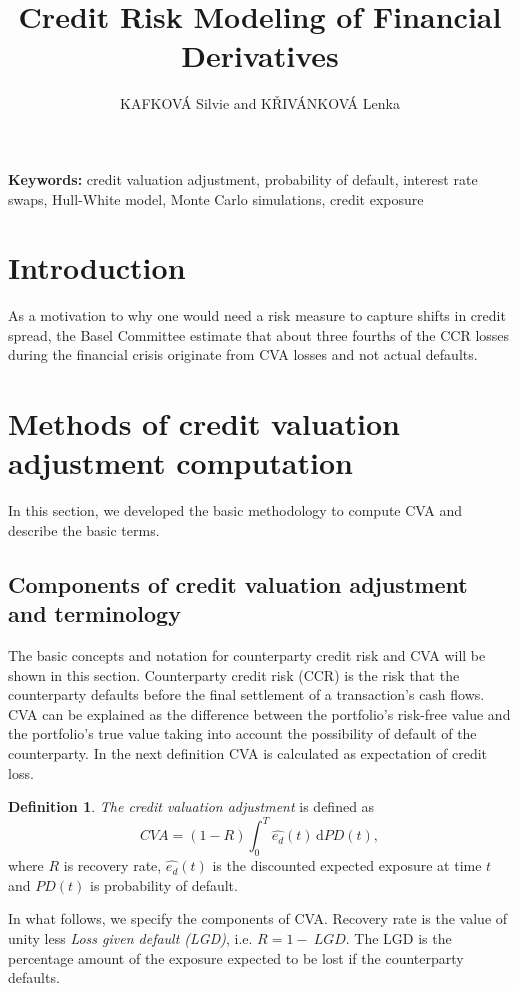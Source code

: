\documentclass{amsart}
\theoremstyle{definition}\newtheorem{definition}[theorem]{Definition}
\theoremstyle{remark}\newtheorem{remark}[theorem]{Remark}
\newcommand{\dif}{\,\mathrm{d}}
\begin{document}
\title{Credit Risk Modeling of Financial Derivatives}
\author{KAFKOVÁ Silvie and KŘIVÁNKOVÁ Lenka}

\begin{abstract}
\end{abstract}
\maketitle

\noindent\textbf{Keywords:} credit valuation adjustment, probability of default, interest rate swaps, Hull-White model, Monte Carlo simulations, credit exposure

\bigskip

\section{Introduction}
As a motivation to why one would need a risk measure to capture shifts in credit spread, the Basel Committee estimate that about three fourths of the CCR losses during the financial crisis originate from CVA losses and not actual defaults.

\section{Methods of credit valuation adjustment computation}
In this section, we developed the basic methodology to compute CVA and describe the basic terms.

\subsection{Components of credit valuation adjustment and terminology}
The basic concepts and notation for counterparty credit risk and CVA will be shown in this section.
Counterparty credit risk (CCR) is the risk that the counterparty defaults before the final settlement of a transaction's cash flows.
CVA can be explained as the difference between the portfolio’s risk-free value and the portfolio’s true value taking into account the possibility of default of the counterparty.
In the next definition CVA is calculated as expectation of credit loss.
\begin{definition}
 \textit{The credit valuation adjustment} is defined as
 \begin{equation}
 CVA=(1-R)\int_{0}^T \hat{e_d}(t)\dif PD(t),
 \label{CVA}
\end{equation}
  where $R$ is recovery rate, $\hat{e_d}(t)$ is the discounted expected exposure at time $t$ and $PD(t)$ is probability of default.
\end{definition}
In what follows, we specify the components of CVA. 
Recovery rate is the value of unity less \textit{Loss given default (LGD)}, i.e. $R=1-~LGD$.
The LGD is the percentage amount of the exposure expected to be lost if the counterparty defaults.
\end{document}
